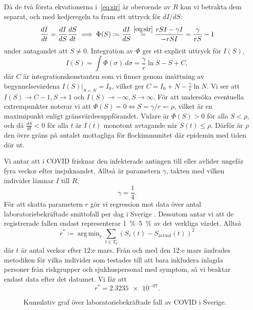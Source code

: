 \documentclass{article}
\DeclareMathOperator*{\argmin}{arg\,min}
\newcommand\covid{COVID\nobreakdash-19}
\begin{document}
Då de två första ekvationerna i~\eqref{eq:sir}
är oberoende av $R$ kan vi betrakta dem separat,
och med kedjeregeln ta fram ett uttryck för $dI/dS$:
$$ \frac{dI}{dt} = \frac{dI}{dS} \frac{dS}{dt}
\implies \Phi(S) \coloneqq \frac{dI}{dS} \overset{\eqref{eq:sir}}= \frac{rSI - \gamma I}{-rSI} = \frac\gamma{rS} - 1 $$
under antagandet att $S \ne 0$.
Integration av $\Phi$ ger ett explicit uttryck för $I(S)$,
$$ I(S) = \int \Phi(\sigma) \, d\sigma = \frac\gamma r \ln S - S + C, $$
där $C$ är integrationskonstanten som vi finner genom
insättning av begynnelsevärdena $I(S) \vert_{S=N} = I_0$,
vilket ger $C = I_0 + N - \frac\gamma r \ln N$.
Vi ser att $I(S) \to C - 1, S \to 1$ och $I(S) \to -\infty, S \to \infty$.
För att undersöka eventuella extrempunkter
noterar vi att $\Phi(S) = 0 \Leftrightarrow S = \gamma / r \eqqcolon \rho$,
vilket är en maximipunkt enligt gränsvärdesuppförandet.
Vidare är $\Phi(S) > 0$ för alla $S < \rho$,
och då $\frac{dS}{dt} < 0$ för alla $t$
är $I(t)$ monotont avtagande när $S(t) \le \rho$.
Därför är $\rho$ den övre gräns på antalet mottagliga för flockimmunitet
där epidemin med tiden dör ut.

Vi antar att i \covid{} frisknar den infekterade antingen till
eller avlider ungefär fyra veckor efter insjuknandet.
Alltså är parametern $\gamma$,
takten med vilken individer lämnar $I$ till $R$,
$$ \gamma = \frac14. $$
För att skatta parametern $r$ gör vi regression mot data över
antal laboratoriebekräftade smittofall per dag i Sverige
\cite{folkhalso}.
Dessutom antar vi att de registrerade fallen endast representerar
\SIrange{1}{5}{\percent} av det verkliga värdet.
Alltså
$$ r^* \coloneqq \argmin_r \sum_{t \in T_q} (S_r(t) - S_{\text{actual}}(t))^2 $$
där $t$ är antal veckor efter 12:e mars.
Från och med den 12:e mars ändrades metodiken för vilka individer
som testades till att bara inkludera inlagda personer från riskgrupper
och sjukhuspersonal med symptom,
så vi beaktar endast data efter det datumet.
Vi får att
$$ r^* = \num{2.3235e-07}. $$


\begin{figure}
	\centering
	\caption{Kumulativ graf över laboratoriebekräftade fall av \covid{} i Sverige.
	\autocite{folkhalso} \label{fig:cum_cases}}
\end{figure}
\end{document}
